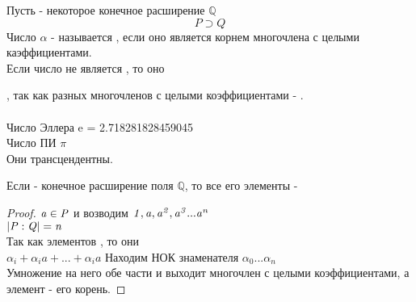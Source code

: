 \begin{defin}
  Пусть  - некоторое конечное расширение $\mathbb Q$\\
  \[P \supset Q \]
  Число $\alpha$ - называется , если оно является корнем
  многочлена с целыми каэффициентами. \\
  Если число не является , то оно 
\end{defin}

, так как разных многочленов с целыми
коэффициентами - . \\
 \\
Число Эллера {\bk e} = 2.718281828459045 \\
Число ПИ $\pi $ \\
Они трансцендентны.\\

\begin{theorem}
  Если  - конечное расширение поля $\mathbb {Q}$, то все его элементы -
\end{theorem}

\begin{proof}
  $\mathit {a \in P}$ и возводим $\mathit {1, a, a^2, a^3...a^n}$ \\
  $\mathit {|P:Q| = n}$ \\
  Так как элементов , то они  \\
  $\alpha_{i} + \alpha_{i}a + ... + \alpha_{i}a$ %
  Находим НОК знаменателя $\alpha_{0} ... \alpha_{n}$ \\
  Умножение на него обе части и выходит многочлен с целыми коэффициентами, а
  элемент  - его корень.
\end{proof}